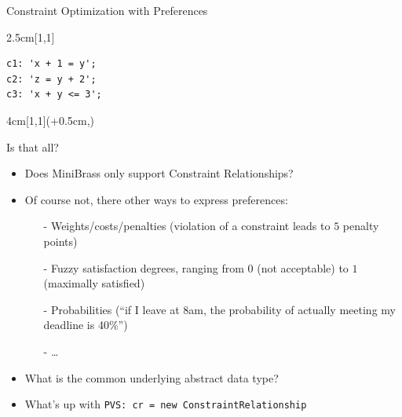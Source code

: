 \begin{frame}[fragile]{Constraint Optimization with Preferences}
\begin{textblock*}{2.5cm}[1,1]
\begin{tikzpicture}
\end{tikzpicture}
\begin{Verbatim}[fontsize=\small]
c1: 'x + 1 = y';
c2: 'z = y + 2';
c3: 'x + y <= 3';   
\end{Verbatim}
\end{textblock*}

\begin{textblock*}{4cm}[1,1](\textwidth+0.5cm,\textheight-3.03cm)




\end{textblock*}
\end{frame}

\begin{frame}{Is that all?}
\begin{itemize}
\item Does MiniBrass only support Constraint Relationships? \pause 
\item Of course not, there other ways to express preferences:
\begin{itemize} \pause 
\item[-] Weights/costs/penalties (violation of a constraint leads to $5$ penalty points) \pause 
\item[-] Fuzzy satisfaction degrees, ranging from $0$ (not acceptable) to $1$ (maximally satisfied) \pause 
\item[-] Probabilities (``if I leave at 8am, the probability of actually meeting my deadline is 40\%'') \pause 
\item[-] \ldots
\end{itemize}

\vspace*{2ex}
\item What is the common underlying abstract data type?
\item What's up with \texttt{PVS: cr = new ConstraintRelationship}
\end{itemize}
\end{frame}

